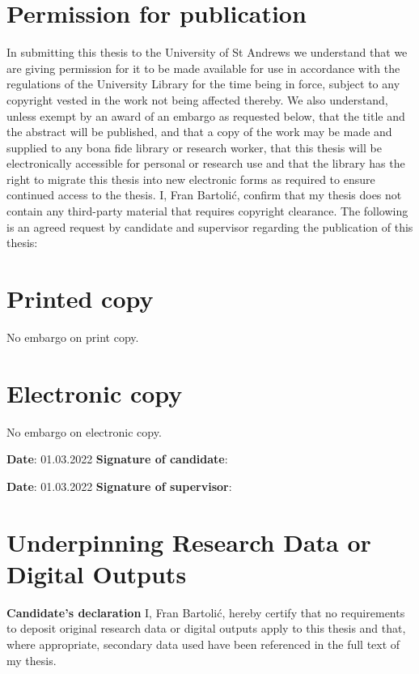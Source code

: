 \documentclass[12pt,dvipsnames]{report}
\begin{document}
\section*{Permission for publication}
In submitting this thesis to the University of St Andrews we understand that we are giving permission for it to be made available for use in accordance with the regulations of the University Library for the time being in force, subject to any copyright vested in the work not being affected thereby. We also understand, unless exempt by an award of an embargo as requested below, that the title and the abstract will be published, and that a copy of the work may be made and supplied to any bona fide library or research worker, that this thesis will be electronically accessible for personal or research use and that the library has the right to migrate this thesis into new electronic forms as required to ensure continued access to the thesis.
\newline
\newline
\noindent I, Fran Bartoli\'{c}, confirm that my thesis does not contain any third-party material that requires copyright clearance.
\newline
\newline
\noindent The following is an agreed request by candidate and supervisor regarding the publication of this thesis:
\section*{Printed copy}
No embargo on print copy.

\section*{Electronic copy}
No embargo on electronic copy.

\vspace{1cm}

\noindent \textbf{Date}: 01.03.2022 \quad\quad \textbf{Signature of candidate}: 

\vspace{1cm}

\noindent \textbf{Date}: 01.03.2022 \quad\quad \textbf{Signature of supervisor}: 

\newpage
\section*{Underpinning Research Data or Digital Outputs}
\textbf{Candidate's declaration}\newline\newline
I, Fran Bartoli\'{c}, hereby certify that no requirements to deposit original research data or digital outputs apply to this thesis and that, where appropriate, secondary data used have been referenced in the full text of my thesis.
\end{document}
